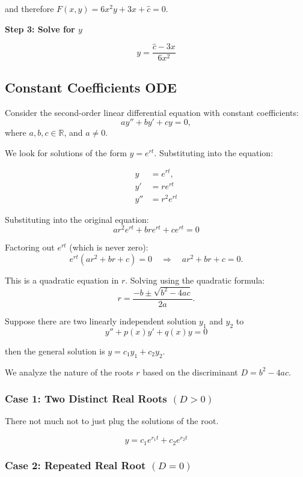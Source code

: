 and therefore \(F(x,y) = 6x^2y + 3x + \hat{c} = 0\).
\vspace{\baselineskip}

\textbf{Step 3: Solve for \(y\)}

\[y = \frac{\hat{c} - 3x}{6x^2} \]

\subsection{Constant Coefficients ODE}

Consider the second-order linear differential equation with constant coefficients:
\[
a y'' + b y' + c y = 0,
\]
where \( a, b, c \in \mathbb{R} \), and \( a \neq 0 \).

We look for solutions of the form \( y = e^{rt} \). Substituting into the equation:

\begin{align*}
y &= e^{rt}, \\
y' &= r e^{rt} \\
y'' &=  r^2 e^{rt}
\end{align*}


Substituting into the original equation:
\[
ar^2 e^{rt} + bre^{rt} + ce^{rt} = 0
\]

Factoring out \( e^{rt} \) (which is never zero):
\[
e^{rt}(ar^2 + br + c) = 0 \quad \Rightarrow \quad ar^2 + br + c = 0.
\]

This is a quadratic equation in \( r \). Solving using the quadratic formula:
\[
r = \frac{-b \pm \sqrt{b^2 - 4ac}}{2a}.
\]

Suppose there are two linearly independent solution \(y_1\) and \(y_2\) to
\[
y'' + p(x)y' + q(x)y = 0
\]

then the general solution is \(y = c_1 y_1 + c_2 y_2\).
\vspace{\baselineskip}

We analyze the nature of the roots \( r \) based on the discriminant \( D = b^2 - 4ac \).

\subsubsection{Case 1: Two Distinct Real Roots \texorpdfstring{\( (D > 0) \)}{}}

There not much not to just plug the solutions of the root.

\[y = c_1 e^{r_1 t} + c_2 e^{r_2 t}\]

\subsubsection{Case 2: Repeated Real Root \texorpdfstring{\( (D = 0) \)}{}}

